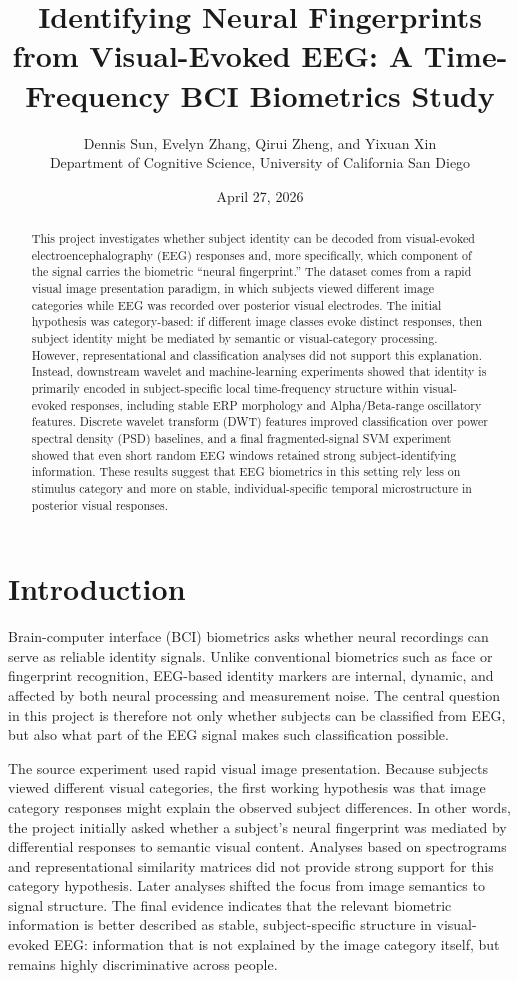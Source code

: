 \documentclass[11pt]{article}
\title{Identifying Neural Fingerprints from Visual-Evoked EEG: A Time-Frequency BCI Biometrics Study}
\author{
Dennis Sun, Evelyn Zhang, Qirui Zheng, and Yixuan Xin\\
\small Department of Cognitive Science, University of California San Diego
}
\date{April 27, 2026}
\begin{document}
\maketitle

\begin{abstract}
This project investigates whether subject identity can be decoded from visual-evoked electroencephalography (EEG) responses and, more specifically, which component of the signal carries the biometric ``neural fingerprint.'' The dataset comes from a rapid visual image presentation paradigm, in which subjects viewed different image categories while EEG was recorded over posterior visual electrodes. The initial hypothesis was category-based: if different image classes evoke distinct responses, then subject identity might be mediated by semantic or visual-category processing. However, representational and classification analyses did not support this explanation. Instead, downstream wavelet and machine-learning experiments showed that identity is primarily encoded in subject-specific local time-frequency structure within visual-evoked responses, including stable ERP morphology and Alpha/Beta-range oscillatory features. Discrete wavelet transform (DWT) features improved classification over power spectral density (PSD) baselines, and a final fragmented-signal SVM experiment showed that even short random EEG windows retained strong subject-identifying information. These results suggest that EEG biometrics in this setting rely less on stimulus category and more on stable, individual-specific temporal microstructure in posterior visual responses.
\end{abstract}

\section{Introduction}

Brain-computer interface (BCI) biometrics asks whether neural recordings can serve as reliable identity signals. Unlike conventional biometrics such as face or fingerprint recognition, EEG-based identity markers are internal, dynamic, and affected by both neural processing and measurement noise. The central question in this project is therefore not only whether subjects can be classified from EEG, but also what part of the EEG signal makes such classification possible.

The source experiment used rapid visual image presentation. Because subjects viewed different visual categories, the first working hypothesis was that image category responses might explain the observed subject differences. In other words, the project initially asked whether a subject's neural fingerprint was mediated by differential responses to semantic visual content. Analyses based on spectrograms and representational similarity matrices did not provide strong support for this category hypothesis. Later analyses shifted the focus from image semantics to signal structure. The final evidence indicates that the relevant biometric information is better described as stable, subject-specific structure in visual-evoked EEG: information that is not explained by the image category itself, but remains highly discriminative across people.
\end{document}
